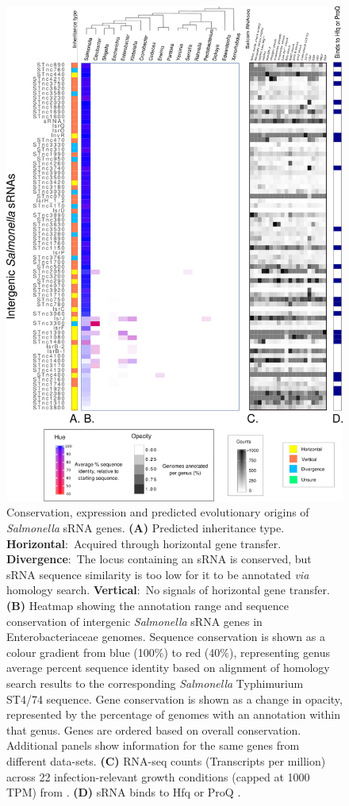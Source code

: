 \begin{figure}[H]
    \centering
    \includegraphics{sal/heatmap_part1.png}
    \caption[Conservation, expression and predicted evolutionary origins of \textit{Salmonella} sRNA genes]{Conservation, expression and predicted evolutionary origins of \textit{Salmonella} sRNA genes. \textbf{(A)} Predicted inheritance type. \textbf{Horizontal}$:$ Acquired through horizontal gene transfer. \textbf{Divergence}$:$ The locus containing an sRNA is conserved, but sRNA sequence similarity is too low for it to be annotated \textit{via} homology search. \textbf{Vertical}$:$ No signals of horizontal gene transfer. \textbf{(B)} Heatmap showing the annotation range and sequence conservation of intergenic \textit{Salmonella} sRNA genes in Enterobacteriaceae genomes. Sequence conservation is shown as a colour gradient from blue (100\%) to red (40\%), representing genus average percent sequence identity based on alignment of homology search results to the corresponding \textit{Salmonella} Typhimurium ST4/74 sequence. Gene conservation is shown as a change in opacity, represented by the percentage of genomes with an annotation within that genus. Genes are ordered based on overall conservation. Additional panels show information for the same genes from different data-sets. \textbf{(C)} RNA-seq counts (Transcripts per million) across 22 infection-relevant growth conditions (capped at 1000 TPM) from \cite{Kroger2013-pg}. \textbf{(D)} sRNA binds to Hfq \citep{Holmqvist2016-hj} or ProQ \citep{Smirnov2016-yt}.}
    \label{fig:sal_heatmap}
\end{figure}
